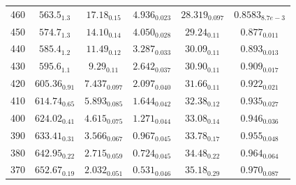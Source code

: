 \documentclass[journal=jctc,manuscript=article]{achemso}
\begin{document}
\begin{table}[htb!]
\begin{center}
\begin{tabular}{|c|c|c|c|c|c|}
			460 & $563.5_{1.3}$ & $17.18_{0.15}$ & $4.936_{0.023}$ & $28.319_{0.097}$ & $0.8583_{8.7e-3}$ \\
			450 & $574.7_{1.3}$ & $14.10_{0.14}$ & $4.050_{0.028}$ & $29.24_{0.11}$ & $0.877_{0.011}$ \\
			440 & $585.4_{1.2}$ & $11.49_{0.12}$ & $3.287_{0.033}$ & $30.09_{0.11}$ & $0.893_{0.013}$ \\
			430 & $595.6_{1.1}$ & $9.29_{0.11}$ & $2.642_{0.037}$ & $30.90_{0.11}$ & $0.909_{0.017}$ \\
			420 & $605.36_{0.91}$ & $7.437_{0.097}$ & $2.097_{0.040}$ & $31.66_{0.11}$ & $0.922_{0.021}$ \\
			410 & $614.74_{0.65}$ & $5.893_{0.085}$ & $1.644_{0.042}$ & $32.38_{0.12}$ & $0.935_{0.027}$ \\
			400 & $624.02_{0.41}$ & $4.615_{0.075}$ & $1.271_{0.044}$ & $33.08_{0.14}$ & $0.946_{0.036}$ \\
			390 & $633.41_{0.31}$ & $3.566_{0.067}$ & $0.967_{0.045}$ & $33.78_{0.17}$ & $0.955_{0.048}$ \\
			380 & $642.95_{0.22}$ & $2.715_{0.059}$ & $0.724_{0.045}$ & $34.48_{0.22}$ & $0.964_{0.064}$ \\
			370 & $652.67_{0.19}$ & $2.032_{0.051}$ & $0.531_{0.046}$ & $35.18_{0.29}$ & $0.970_{0.087}$ \\
			\hline
		\end{tabular}
	\end{center}
\end{table}
\end{document}
